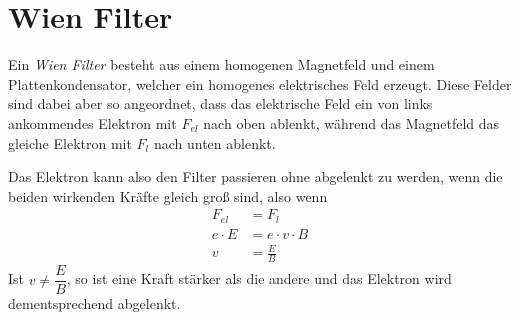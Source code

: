 \documentclass{article}
\begin{document}
\section{Wien Filter}
Ein \emph{Wien Filter} besteht aus einem homogenen Magnetfeld und einem Plattenkondensator, welcher ein homogenes elektrisches Feld erzeugt. Diese Felder sind dabei aber so angeordnet, dass das elektrische Feld ein von links ankommendes Elektron mit $F_{el}$ nach oben ablenkt, während das Magnetfeld das gleiche Elektron mit $F_{l}$ nach unten ablenkt.
 
Das Elektron kann also den Filter passieren ohne abgelenkt zu werden, wenn die beiden wirkenden Kräfte gleich groß sind, also wenn
\begin{align*}
 F_{el} &= F_l \\
 e \cdot E &= e \cdot v \cdot B \\
 v &= \frac{E}{B} 
\end{align*} 
Ist $v \ne \dfrac{E}{B}$, so ist eine Kraft stärker als die andere und das Elektron wird dementsprechend abgelenkt. 
\end{document}

